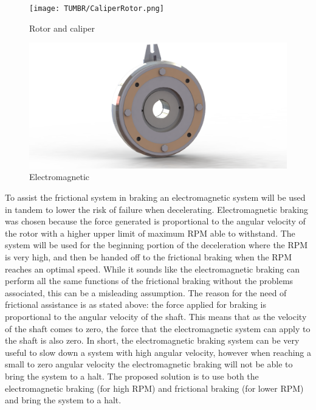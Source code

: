 \begin{figure}[!ht]
\centering
\begin{minipage}{.5\textwidth}
  \centering
  \texttt{[image: TUMBR/CaliperRotor.png]}
  \caption{\label{fig:DiscBrake}Rotor and caliper}
\end{minipage}%
\begin{minipage}{.5\textwidth}
  \centering
  \includegraphics[width=0.9\linewidth]{TUMBR/EM.png}
  \caption{\label{fig:Electro}Electromagnetic}
\end{minipage}
\end{figure}

\indent\indent To assist the frictional system in braking an electromagnetic system will be used in tandem to lower the risk of failure when decelerating. Electromagnetic braking was chosen because the force generated is proportional to the angular velocity of the rotor with a higher upper limit of maximum RPM able to withstand. The system will be used for the beginning portion of the deceleration where the RPM is very high, and then be handed off to the frictional braking when the RPM reaches an optimal speed. While it sounds like the electromagnetic braking can perform all the same functions of the frictional braking without the problems associated, this can be a misleading assumption.  The reason for the need of frictional assistance is as stated above: the force applied for braking is proportional to the angular velocity of the shaft. This means that as the velocity of the shaft comes to zero, the force that the electromagnetic system can apply to the shaft is also zero. In short, the electromagnetic braking system can be very useful to slow down a system with high angular velocity, however when reaching a small to zero angular velocity the electromagnetic braking will not be able to bring the system to a halt. The proposed solution is to use both the electromagnetic braking (for high RPM) and frictional braking (for lower RPM) and bring the system to a halt.

